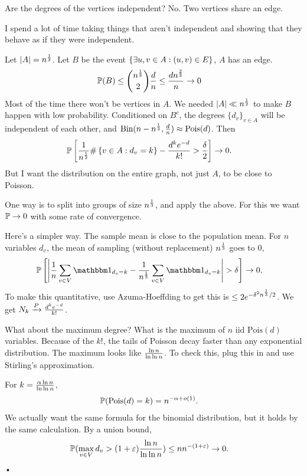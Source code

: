 Are the degrees of the vertices independent? No. Two vertices share an edge.

I spend a lot of time taking things that aren't independent and showing that they behave as if they were independent.

Let $|A|=n^{\frac{1}{3}}$. 
Let $B$ be the event $\left\{{\exists u,v\in A}:{(u,v)\in E}\right\}$, $A$ has an edge.
\begin{align}
\mathbb{P}(B) &\le \binom{n^{\frac{1}{3}}}2\frac{d}{n} \le \frac{dn^{\frac{2}{3}}}{n}\to 0
\end{align}
Most of the time there won't be vertices in $A$.
We needed $|A|\ll n^{\frac{1}{2}}$ to make $B$ happen with low probability.
Conditioned on $B^c$, the degrees $\{d_v\}_{v\in A}$ will be independent of each other, and $\text{Bin}(n-n^{\frac{1}{3}},\frac{d}{n})\approx \text{Pois}(d)$. Then 
\begin{align}
\mathbb{P}\left[ {\frac{1}{n^{\frac{1}{3}}}\#\left\{{v\in A}:{d_v=k}\right\} - \frac{d^ke^{-d}}{k!}> \frac{\delta}{2}} \right]&\to 0.
\end{align}
But I want the distribution on the entire graph, not just $A$, to be close to Poisson.

One way is to split into groups of size $n^{\frac{1}{3}}$, and apply the above. For this we want $\mathbb{P} \to 0$ with some rate of convergence.

Here's a simpler way.
The sample mean is close to the population mean.
For $n$ variables $d_v$, the mean of sampling (without replacement) $n^{\frac{1}{3}}$ goes to 0, 
\begin{align}
\Pj\ba{\ab{\rc n \sum_{v\in V} \one_{d_v=k} - \rc{n^{\rc 3}} \sum_{v\in V} \one_{d_v=k}}>\de}&\to 0.
\end{align}
To make this quantitative, use Azuma-Hoeffding to get this is $\le 2e^{-\delta^2 n^{\frac{1}{3}}/2}$. We get $N_k\xrightarrow{P} \frac{d^ke^{-d}}{k!}$. 

What about the maximum degree? What is the maximum of $n$ iid $\text{Pois}(d)$ variables. Because of the $k!$, the tails of Poisson decay faster than any exponential distribution. The maximum looks like $\frac{\ln n}{\ln \ln n}$. To check this, plug this in and use Stirling's approximation.

For $k=\frac{\alpha\ln n}{\ln \ln n}$, 
\begin{align}
\mathbb{P}(\text{Pois}(d)=k) &=n^{-\alpha+o(1)}.
\end{align}
We actually want the same formula for the binomial distribution, but it holds by the same calculation.
By a union bound,
\begin{align}
\mathbb{P}(\max_{v\in V} d_v > (1+\varepsilon) \frac{\ln n}{\ln \ln n})&\le nn^{-(1+\varepsilon)}\to 0.
\end{align}•

